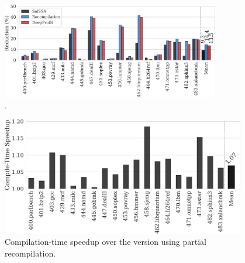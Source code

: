 \begin{figure}[h]
  \centering
  \includegraphics[width=0.85\textwidth]{src/deeplearning/figs/code-size-reduction-threshold-tuning.pdf}
  \caption{.}
  \label{fig:code-size-reduction}
\end{figure}



\begin{figure}[h]
  \centering
  \includegraphics[width=0.95\textwidth]{src/deeplearning/figs/compilation-time-speedup.pdf}
  \caption{Compilation-time speedup over the version using partial recompilation.}
  \label{fig:compilation-time-speedup}
\end{figure}

